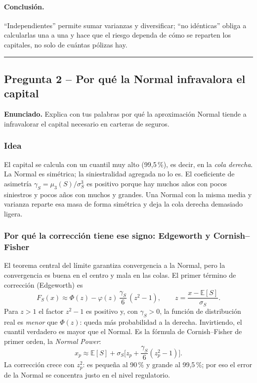 \documentclass[a4paper,12pt]{article}
\newcommand{\E}{\mathbb{E}}
\begin{document}
\paragraph{Conclusi\'on.} ``Independientes'' permite sumar varianzas y diversificar; ``no id\'enticas'' obliga a calcularlas una a una y hace que el riesgo dependa de c\'omo se reparten los capitales, no solo de cu\'antas p\'olizas hay.

\bigskip\hrule\bigskip

\subsection{Pregunta 2 -- Por qu\'e la Normal infravalora el capital}

\noindent\textbf{Enunciado.} Explica con tus palabras por qu\'e la aproximaci\'on Normal tiende a infravalorar el capital necesario en carteras de seguros.

\subsubsection*{Idea}
El capital se calcula con un cuantil muy alto (99,5\,\%), es decir, en la \emph{cola derecha}. La Normal es sim\'etrica; la siniestralidad agregada no lo es. El coeficiente de asimetr\'ia $\gamma_S=\mu_3(S)/\sigma_S^3$ es positivo porque hay muchos a\~nos con pocos siniestros y pocos a\~nos con muchos y grandes. Una Normal con la misma media y varianza reparte esa masa de forma sim\'etrica y deja la cola derecha demasiado ligera.

\subsubsection*{Por qu\'e la correcci\'on tiene ese signo: Edgeworth y Cornish--Fisher}
El teorema central del l\'imite garantiza convergencia a la Normal, pero la convergencia es buena en el centro y mala en las colas. El primer t\'ermino de correcci\'on (Edgeworth) es
\[
F_S(x)\approx\Phi(z)-\varphi(z)\,\frac{\gamma_S}{6}\,(z^2-1),\qquad z=\frac{x-\E[S]}{\sigma_S}.
\]
Para $z>1$ el factor $z^2-1$ es positivo y, con $\gamma_S>0$, la funci\'on de distribuci\'on real es \emph{menor} que $\Phi(z)$: queda m\'as probabilidad a la derecha. Invirtiendo, el cuantil verdadero es mayor que el Normal. Es la f\'ormula de Cornish--Fisher de primer orden, la \emph{Normal Power}:
\[
x_p\approx\E[S]+\sigma_S\Big[z_p+\frac{\gamma_S}{6}(z_p^2-1)\Big].
\]
La correcci\'on crece con $z_p^2$: es peque\~na al 90\,\% y grande al 99,5\,\%; por eso el error de la Normal se concentra justo en el nivel regulatorio.
\end{document}
